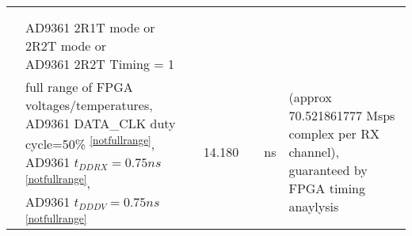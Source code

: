 \documentclass{article}
\begin{document}
\begin{scriptsize}
\begin{longtable}{|c|l|c|c|c|c|l|}
                          &                                      &                                & &                                &                      & \\
                          &                                      &                                & &                                &                      & \\
                          & \multirow{2}{*}{\parbox{6.7 cm}{\hspace*{9mm}AD9361 2R1T mode or 2R2T mode or \\ \hspace*{9mm}AD9361 2R2T Timing = 1}} & & & & & \\
                          &                                      &                                & &                                &                      & \\
                          & \multirow{5}{*}{\parbox{6.7cm}{\hspace*{12mm}full range of FPGA voltages/temperatures,\\ \hspace*{12mm}AD9361 DATA\_CLK duty cycle=50\% \textsuperscript{\ref{notfullrange}}, \\ \hspace*{12mm}AD9361 $t_{DDRX}=0.75 ns$ \textsuperscript{\ref{notfullrange}}, \\ \hspace*{12mm}AD9361 $t_{DDDV}=0.75ns$ \textsuperscript{\ref{notfullrange}} }} & & \multirow{5}{*}{14.180} & & \multirow{5}{*}{ns} & \multirow{5}{*}{\parbox{3.0cm}{(approx 70.521861777 Msps complex per RX channel), \\ guaranteed by FPGA timing anaylysis}} \\
                          &                                      &                                & &                                &                      & \\
                          &                                      &                                & &                                &                      & \\
                          &                                      &                                & &                                &                      & \\
                          &                                      &                                & &                                &                      & \\
		\hline
	\end{longtable}
\end{scriptsize}
\end{document}
